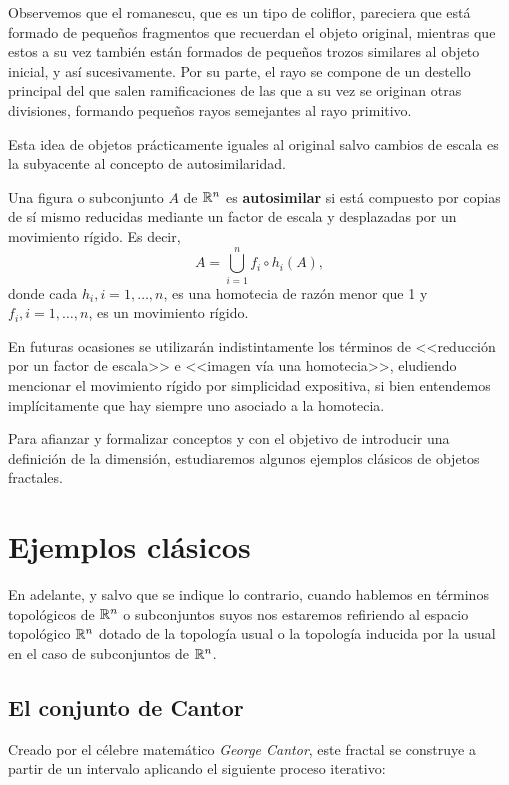 Observemos que el romanescu, que es un tipo de coliflor, pareciera que está formado de pequeños fragmentos que recuerdan el objeto original, mientras que estos a su vez también están formados de pequeños trozos similares al objeto inicial, y así sucesivamente. Por su parte, el rayo se compone de un destello principal del que salen ramificaciones de las que a su vez se originan otras divisiones, formando pequeños rayos semejantes al rayo primitivo.

Esta idea de objetos prácticamente iguales al original salvo cambios de escala es la subyacente al concepto de autosimilaridad.

\begin{definicion}[Autosimilaridad] 
\label{def:autosimilaridad}  
Una figura o subconjunto $A$ de $\mathbb{R}^n$ es \textbf{autosimilar} si está compuesto por copias de sí mismo reducidas mediante un factor de escala y desplazadas por un movimiento rígido. Es decir,
$$
A = \bigcup_{i=1}^n f_i\circ h_i(A),
$$
donde cada $h_i, i=1,\dots,n$, es una homotecia de razón menor que 1 y $f_i, i=1,\dots,n$, es un movimiento rígido. 
\end{definicion}

En futuras ocasiones se utilizarán indistintamente los términos de <<reducción por un factor de escala>> e <<imagen vía una homotecia>>, eludiendo mencionar el movimiento rígido por simplicidad expositiva, si bien entendemos implícitamente que hay siempre uno asociado a la homotecia.

Para afianzar y formalizar conceptos y con el objetivo de introducir una definición de la dimensión, estudiaremos algunos ejemplos clásicos de objetos fractales.

\section{Ejemplos clásicos}
\label{section:ejemplos}

En adelante, y salvo que se indique lo contrario, cuando hablemos en términos topológicos de $\mathbb{R}^n$ o subconjuntos suyos nos estaremos refiriendo al espacio topológico $\mathbb{R}^n$ dotado de la topología usual o la topología inducida por la usual en el caso de subconjuntos de $\mathbb{R}^n$.

\subsection{El conjunto de Cantor}
\label{subsection:Cantor}

Creado por el célebre matemático \textit{George Cantor}, este fractal se construye a partir de un intervalo aplicando el siguiente proceso iterativo:

